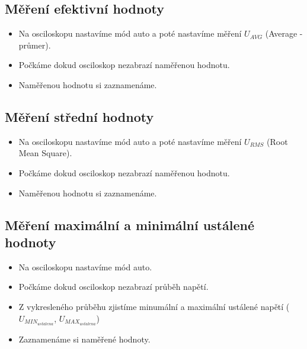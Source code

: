   \subsection{Měření efektivní hodnoty}
    \begin{itemize}
      \item
        Na osciloskopu nastavíme mód auto a poté nastavíme měření $U_{AVG}$ (Average - průmer).
      \item
        Počkáme dokud osciloskop nezabrazí naměřenou hodnotu.
      \item
        Naměřenou hodnotu si zaznamenáme.
    \end{itemize}
    
  \subsection{Měření střední hodnoty}
    \begin{itemize}
      \item
        Na osciloskopu nastavíme mód auto a poté nastavíme měření $U_{RMS}$ (Root Mean Square).
      \item
        Počkáme dokud osciloskop nezabrazí naměřenou hodnotu.
      \item
        Naměřenou hodnotu si zaznamenáme.
    \end{itemize}
    
  \subsection{Měření maximální a minimální ustálené hodnoty}
    \begin{itemize}
      \item
        Na osciloskopu nastavíme mód auto.
      \item
        Počkáme dokud osciloskop nezabrazí průběh napětí.
      \item
        Z vykresleného průběhu zjistíme minumální a maximální ustálené napětí ($U_{MIN_{ustalena}}$, $U_{MAX_{ustalena}}$)
      \item
        Zaznamenáme si naměřené hodnoty.
    \end{itemize}
  
